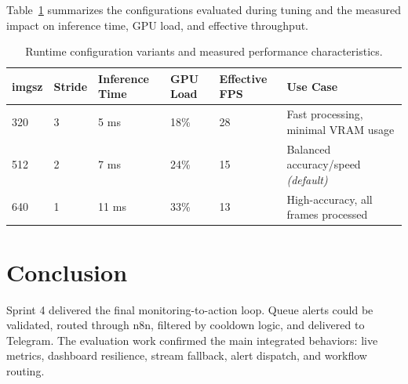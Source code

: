 Table~\ref{tab:sprint4_tuning_examples} summarizes the configurations evaluated during tuning and the measured impact on inference time, GPU load, and effective throughput.

\begin{table}[H]
    \centering
    \begingroup\setlength{\tabcolsep}{4pt}\renewcommand{\arraystretch}{0.95}\footnotesize
    \begin{tabularx}{\textwidth}{|l|l|l|l|l|X|}
        \hline
        \textbf{imgsz} & \textbf{Stride} & \textbf{Inference Time} & \textbf{GPU Load} & \textbf{Effective FPS} & \textbf{Use Case} \\ \hline
        320 & 3 & 5 ms & 18\% & 28 & Fast processing, minimal VRAM usage \\ \hline
        512 & 2 & 7 ms & 24\% & 15 & Balanced accuracy/speed \textit{(default)} \\ \hline
        640 & 1 & 11 ms & 33\% & 13 & High-accuracy, all frames processed \\ \hline
    \end{tabularx}
    \caption{Runtime configuration variants and measured performance characteristics.}
    \label{tab:sprint4_tuning_examples}
    \endgroup
\end{table}

\section{Conclusion}
Sprint 4 delivered the final monitoring-to-action loop. Queue alerts could be validated, routed through n8n, filtered by cooldown logic, and delivered to Telegram. The evaluation work confirmed the main integrated behaviors: live metrics, dashboard resilience, stream fallback, alert dispatch, and workflow routing.